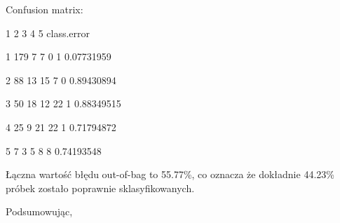 Confusion matrix:

   1  2  3  4 5 class.error
   
 1 179  7  7  0 1  0.07731959
 
 2  88 13 15  7 0  0.89430894
 
 3  50 18 12 22 1  0.88349515
 
 4  25  9 21 22 1  0.71794872
 
 5   7  3  5  8 8  0.74193548
 
Łączna wartość błędu out-of-bag to 55.77\%, co oznacza że dokładnie 44.23\% próbek zostało poprawnie sklasyfikowanych. 



Podsumowując, 




